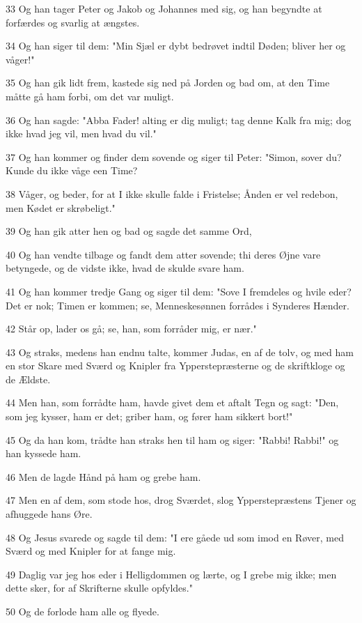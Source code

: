 \par 33 Og han tager Peter og Jakob og Johannes med sig, og han begyndte at forfærdes og svarlig at ængstes.
\par 34 Og han siger til dem: "Min Sjæl er dybt bedrøvet indtil Døden; bliver her og våger!"
\par 35 Og han gik lidt frem, kastede sig ned på Jorden og bad om, at den Time måtte gå ham forbi, om det var muligt.
\par 36 Og han sagde: "Abba Fader! alting er dig muligt; tag denne Kalk fra mig; dog ikke hvad jeg vil, men hvad du vil."
\par 37 Og han kommer og finder dem sovende og siger til Peter: "Simon, sover du? Kunde du ikke våge een Time?
\par 38 Våger, og beder, for at I ikke skulle falde i Fristelse; Ånden er vel redebon, men Kødet er skrøbeligt."
\par 39 Og han gik atter hen og bad og sagde det samme Ord,
\par 40 Og han vendte tilbage og fandt dem atter sovende; thi deres Øjne vare betyngede, og de vidste ikke, hvad de skulde svare ham.
\par 41 Og han kommer tredje Gang og siger til dem: "Sove I fremdeles og hvile eder? Det er nok; Timen er kommen; se, Menneskesønnen forrådes i Synderes Hænder.
\par 42 Står op, lader os gå; se, han, som forråder mig, er nær."
\par 43 Og straks, medens han endnu talte, kommer Judas, en af de tolv, og med ham en stor Skare med Sværd og Knipler fra Ypperstepræsterne og de skriftkloge og de Ældste.
\par 44 Men han, som forrådte ham, havde givet dem et aftalt Tegn og sagt: "Den, som jeg kysser, ham er det; griber ham, og fører ham sikkert bort!"
\par 45 Og da han kom, trådte han straks hen til ham og siger: "Rabbi! Rabbi!" og han kyssede ham.
\par 46 Men de lagde Hånd på ham og grebe ham.
\par 47 Men en af dem, som stode hos, drog Sværdet, slog Ypperstepræstens Tjener og afhuggede hans Øre.
\par 48 Og Jesus svarede og sagde til dem: "I ere gåede ud som imod en Røver, med Sværd og med Knipler for at fange mig.
\par 49 Daglig var jeg hos eder i Helligdommen og lærte, og I grebe mig ikke; men dette sker, for af Skrifterne skulle opfyldes."
\par 50 Og de forlode ham alle og flyede.

